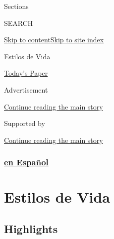 Sections

SEARCH

\protect\hyperlink{site-content}{Skip to
content}\protect\hyperlink{site-index}{Skip to site index}

\href{https://www.nytimes3xbfgragh.onion/es/section/estilos-de-vida}{Estilos
de Vida}

\href{https://myaccount.nytimes3xbfgragh.onion/auth/login?response_type=cookie\&client_id=vi}{}

\href{https://www.nytimes3xbfgragh.onion/section/todayspaper}{Today's
Paper}

Advertisement

\protect\hyperlink{after-top}{Continue reading the main story}

Supported by

\protect\hyperlink{after-sponsor}{Continue reading the main story}

\hypertarget{en-espauxf1ol}{%
\subsubsection{\texorpdfstring{\href{/es/}{en
Español}}{en Español}}\label{en-espauxf1ol}}

\hypertarget{estilos-de-vida}{%
\section{Estilos de Vida}\label{estilos-de-vida}}

\hypertarget{highlights}{%
\subsection{Highlights}\label{highlights}}

